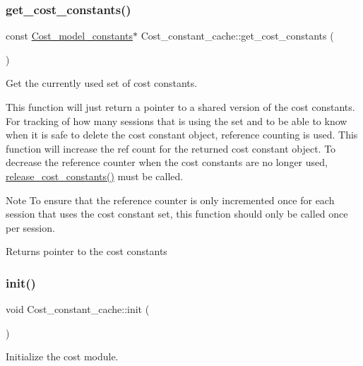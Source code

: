 \subsubsection{\texorpdfstring{get\+\_\+cost\+\_\+constants()}{get\_cost\_constants()}}
{\footnotesize\ttfamily const \mbox{\hyperlink{classCost__model__constants}{Cost\+\_\+model\+\_\+constants}}$\ast$ Cost\+\_\+constant\+\_\+cache\+::get\+\_\+cost\+\_\+constants (\begin{DoxyParamCaption}{ }\end{DoxyParamCaption})\hspace{0.3cm}{\ttfamily [inline]}}

Get the currently used set of cost constants.

This function will just return a pointer to a shared version of the cost constants. For tracking of how many sessions that is using the set and to be able to know when it is safe to delete the cost constant object, reference counting is used. This function will increase the ref count for the returned cost constant object. To decrease the reference counter when the cost constants are no longer used, \mbox{\hyperlink{classCost__constant__cache_a9f8a07c3d8481469e7aebadd3b11298f}{release\+\_\+cost\+\_\+constants()}} must be called.

\begin{DoxyNote}{Note}
To ensure that the reference counter is only incremented once for each session that uses the cost constant set, this function should only be called once per session.
\end{DoxyNote}
\begin{DoxyReturn}{Returns}
pointer to the cost constants 
\end{DoxyReturn}
\mbox{\label{classCost__constant__cache_a27341cb9a16b958f01fc394f3c1c8118}} 
\subsubsection{\texorpdfstring{init()}{init()}}
{\footnotesize\ttfamily void Cost\+\_\+constant\+\_\+cache\+::init (\begin{DoxyParamCaption}{ }\end{DoxyParamCaption})}

Initialize the cost module.

